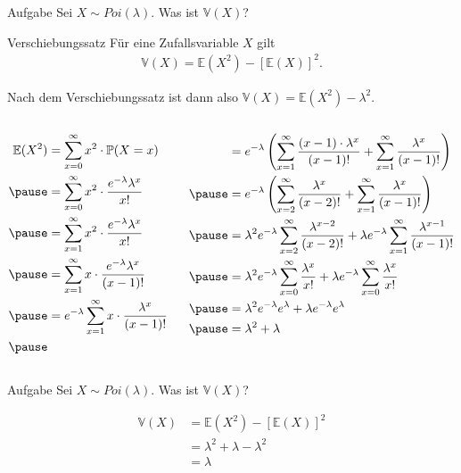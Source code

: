 \documentclass[t,11pt,aspectratio=169]{beamer}
\begin{document}
\begin{frame}
	\begin{block}{Aufgabe}
	Sei $X\sim Poi(\lambda)$. Was ist $\mathbb{V}(X)$?
	\end{block}
	\pause
	\begin{alertblock}{Verschiebungssatz}
	Für eine Zufallsvariable $X$ gilt
	\begin{align*}
	\mathbb{V}(X) =  \mathbb{E}(X^2)-\left[ \mathbb{E}(X) \right]^2.
	\end{align*}
	\end{alertblock}
	\pause
	Nach dem Verschiebungssatz ist dann also $\mathbb{V}(X) = \mathbb{E}(X^2)- \lambda^2.$
\end{frame}

\begin{frame}
\begin{columns}[T] %
\begin{column}{.3\textwidth}
\begin{align*}
\mathbb{E}(X^2)	 &= \sum_{x=0}^{\infty}x^2\cdot \mathbb{P}(X=x) \\ \pause
&= \sum_{x=0}^{\infty}x^2\cdot \frac{e^{-\lambda}\lambda^x}{x!} \\ \pause
&= \sum_{x=1}^{\infty}x^2\cdot \frac{e^{-\lambda}\lambda^x}{x!} \\ \pause
&= \sum_{x=1}^{\infty}x\cdot \frac{e^{-\lambda}\lambda^x}{(x-1)!} \\ \pause
&= e^{-\lambda}\sum_{x=1}^{\infty}x\cdot \frac{\lambda^{x}}{(x-1)!} \\ \pause
\end{align*}
\end{column}
\vrule
\begin{column}{.7\textwidth}
\begin{align*}
&= e^{-\lambda} \left( \sum_{x=1}^{\infty}  \frac{(x-1)\cdot \lambda^x}{(x-1)!}+ \sum_{x=1}^{\infty} \frac{\lambda^x}{(x-1)!}  \right) \\ \pause
&= e^{-\lambda} \left(\sum_{x=2}^{\infty} \frac{\lambda^x}{(x-2)!} +  \sum_{x=1}^{\infty} \frac{\lambda^x}{(x-1)!} \right) \\ \pause
&= \lambda^2 e^{-\lambda} \sum_{x=2}^{\infty} \frac{\lambda^{x-2}}{(x-2)!} + \lambda  e^{-\lambda} \sum_{x=1}^{\infty} \frac{\lambda^{x-1}}{(x-1)!}\\ \pause
&= \lambda^2 e^{-\lambda} \sum_{x=0}^{\infty} \frac{\lambda^x}{x!} + \lambda  e^{-\lambda} \sum_{x=0}^{\infty} \frac{\lambda^x}{x!} \\ \pause
&= \lambda^2 e^{-\lambda} e^{\lambda} + \lambda e^{-\lambda} e^{\lambda} \\ \pause
&= \lambda ^2 + \lambda 
\end{align*}
\end{column}
\end{columns}
\end{frame}

\begin{frame}
\begin{block}{Aufgabe}
Sei $X\sim Poi(\lambda)$. Was ist $\mathbb{V}(X)$?
\end{block}
\begin{align*}
\mathbb{V}(X) &=  \mathbb{E}(X^2)-\left[ \mathbb{E}(X) \right]^2 \\
&= \lambda^2 +\lambda -\lambda^2 \\
&= \lambda
\end{align*}
\end{frame}
\end{document}

